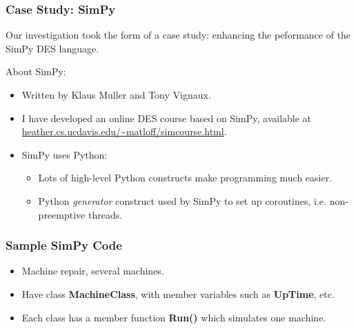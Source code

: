 \documentclass{beamer}
\begin{document}
\begin{frame}
\frametitle{Case Study:  SimPy}

Our investigation took the form of a case study:  enhancing the
peformance of the SimPy DES language.

\pause

About SimPy:

\begin{itemize}

\pause

\item Written by Klaus Muller and Tony Vignaux.

\pause

\item I have developed an online DES course based on SimPy, available
at \url{heather.cs.ucdavis.edu/~matloff/simcourse.html}.

\pause

\item SimPy uses Python:

\pause

   \begin{itemize}

   \item Lots of high-level Python constructs make programming much
   easier.

   \pause

   \item Python {\it generator} construct used by SimPy to set up
   coroutines, i.e. non-preemptive threads.

   \end{itemize}

\end{itemize}

\end{frame}

\begin{frame}
\frametitle{Sample SimPy Code}

\begin{itemize}

\pause

\item Machine repair, several machines.

\pause

\item Have class {\bf MachineClass}, with member variables such as
{\bf UpTime}, etc.

\pause

\item Each class has a member function {\bf Run()} which simulates one
machine.

\end{itemize}

\end{frame}
\end{document}
